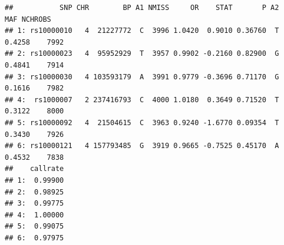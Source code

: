 \documentclass[
]{book}
\newenvironment{Shaded}{\begin{snugshade}}{\end{snugshade}}
\newcommand{\AttributeTok}[1]{\textcolor[rgb]{0.77,0.63,0.00}{#1}}
\newcommand{\ConstantTok}[1]{\textcolor[rgb]{0.00,0.00,0.00}{#1}}
\newcommand{\FunctionTok}[1]{\textcolor[rgb]{0.00,0.00,0.00}{#1}}
\newcommand{\NormalTok}[1]{#1}
\newcommand{\OtherTok}[1]{\textcolor[rgb]{0.56,0.35,0.01}{#1}}
\newcommand{\SpecialCharTok}[1]{\textcolor[rgb]{0.00,0.00,0.00}{#1}}
\newcommand{\StringTok}[1]{\textcolor[rgb]{0.31,0.60,0.02}{#1}}
\begin{document}
\begin{Shaded}
\end{Shaded}

\begin{verbatim}
##           SNP CHR        BP A1 NMISS     OR    STAT       P A2    MAF NCHROBS
## 1: rs10000010   4  21227772  C  3996 1.0420  0.9010 0.36760  T 0.4258    7992
## 2: rs10000023   4  95952929  T  3957 0.9902 -0.2160 0.82900  G 0.4841    7914
## 3: rs10000030   4 103593179  A  3991 0.9779 -0.3696 0.71170  G 0.1616    7982
## 4:  rs1000007   2 237416793  C  4000 1.0180  0.3649 0.71520  T 0.3122    8000
## 5: rs10000092   4  21504615  C  3963 0.9240 -1.6770 0.09354  T 0.3430    7926
## 6: rs10000121   4 157793485  G  3919 0.9665 -0.7525 0.45170  A 0.4532    7838
##    callrate
## 1:  0.99900
## 2:  0.98925
## 3:  0.99775
## 4:  1.00000
## 5:  0.99075
## 6:  0.97975
\end{verbatim}
\end{document}
